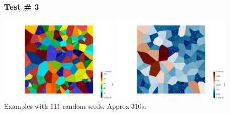 \subsubsection*{Test \# 3}

\begin{center}
\includegraphics[width=6cm]{python_codes/fieldstone_125/results/test3}
\includegraphics[width=6cm]{python_codes/fieldstone_125/results/test3_area}\\
{\captionfont Examples with 111 random seeds. Approx 310s.}
\end{center}



